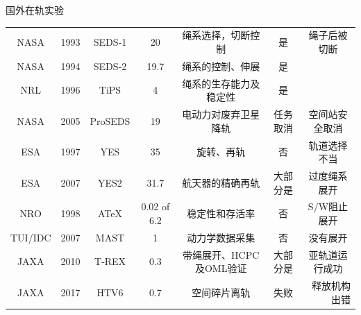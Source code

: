 \documentclass[sectioncirclenumberstyle]{le2iutbmbeamer}
\begin{document}
\begin{frame}[label=online]{国外在轨实验}
{\begin{tabular}{ccccccr}
NASA  & 1993  & SEDS‐1 & 20    & 绳系选择，切断控制 & 是     & \multicolumn{1}{c}{绳子后被切断} \\
NASA  & 1994  & SEDS‐2 & 19.7  & 绳系的控制、伸展 & 是     &  \\
NRL   & 1996  & TiPS  & 4     & 绳系的生存能力及稳定性 & 是     &  \\
\rowcolor[rgb]{ .867,  .922,  .969} \textcolor[rgb]{ .753,  0,  0}{NASA} & \textcolor[rgb]{ .753,  0,  0}{2005} & \textcolor[rgb]{ .753,  0,  0}{ProSEDS} & \textcolor[rgb]{ .753,  0,  0}{19} & \textcolor[rgb]{ .753,  0,  0}{电动力对废弃卫星降轨} & \textcolor[rgb]{ .753,  0,  0}{任务取消} & \multicolumn{1}{c}{\textcolor[rgb]{ .753,  0,  0}{空间站安全取消}} \\
ESA   & 1997  & YES   & 35    & 旋转、再轨 & 否     & \multicolumn{1}{c}{轨道选择不当} \\
ESA   & 2007  & YES2  & 31.7  & 航天器的精确再轨 & 大部分是  & \multicolumn{1}{c}{过度绳系展开} \\
NRO   & 1998  & ATeX  & 0.02 of 6.2 & 稳定性和存活率 & 否     & \multicolumn{1}{c}{S/W阻止展开} \\
\rowcolor[rgb]{ .867,  .922,  .969} \textcolor[rgb]{ .753,  0,  0}{TUI/IDC} & \textcolor[rgb]{ .753,  0,  0}{2007} & \textcolor[rgb]{ .753,  0,  0}{MAST} & \textcolor[rgb]{ .753,  0,  0}{1} & \textcolor[rgb]{ .753,  0,  0}{动力学数据采集} & \textcolor[rgb]{ .753,  0,  0}{否} & \multicolumn{1}{c}{\textcolor[rgb]{ .753,  0,  0}{没有展开}} \\
\rowcolor[rgb]{ .867,  .922,  .969} \textcolor[rgb]{ .753,  0,  0}{JAXA} & \textcolor[rgb]{ .753,  0,  0}{2010} & \textcolor[rgb]{ .753,  0,  0}{T‐REX} & \textcolor[rgb]{ .753,  0,  0}{0.3} & \textcolor[rgb]{ .753,  0,  0}{带绳展开、HCPC及OML验证} & \textcolor[rgb]{ .753,  0,  0}{大部分是} & \multicolumn{1}{c}{\textcolor[rgb]{ .753,  0,  0}{亚轨道运行成功}} \\
\rowcolor[rgb]{ .867,  .922,  .969} \textcolor[rgb]{ .753,  0,  0}{JAXA} & \textcolor[rgb]{ .753,  0,  0}{2017} & \textcolor[rgb]{ .753,  0,  0}{HTV6} & \textcolor[rgb]{ .753,  0,  0}{0.7} & \textcolor[rgb]{ .753,  0,  0}{空间碎片离轨} & \textcolor[rgb]{ .753,  0,  0}{失败} & \textcolor[rgb]{ .753,  0,  0}{释放机构出错} \\
\bottomrule
\end{tabular}}
\end{frame}
\end{document}
